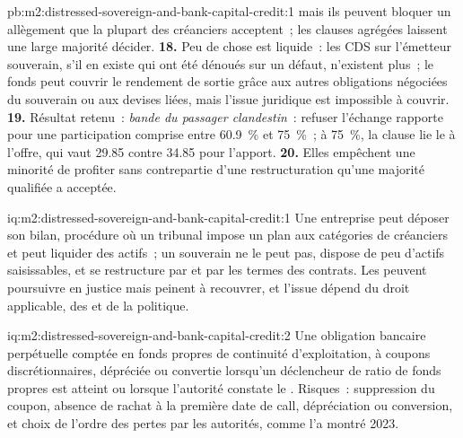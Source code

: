 \begin{solution}{pb:m2:distressed-sovereign-and-bank-capital-credit:1}
mais ils peuvent bloquer un allègement que la plupart des créanciers acceptent~; les clauses agrégées
laissent une large majorité décider.
\textbf{18.} Peu de chose est liquide~: les CDS sur l'émetteur souverain, s'il en existe qui ont été
dénoués sur un défaut, n'existent plus~; le fonds peut couvrir le rendement de sortie grâce aux autres obligations négociées du souverain ou
aux devises liées, mais l'issue juridique est impossible à couvrir.
\textbf{19.} Résultat retenu~: \emph{bande du passager clandestin}~: refuser l'échange rapporte pour une participation
comprise entre 60.9~\% et 75~\%~; à 75~\%, la clause lie le  à l'offre, qui vaut 29.85
contre 34.85 pour l'apport.
\textbf{20.} Elles empêchent une minorité de profiter sans contrepartie d'une restructuration
qu'une majorité qualifiée a acceptée.
\end{solution}

\begin{solution}{iq:m2:distressed-sovereign-and-bank-capital-credit:1}
Une entreprise peut déposer son bilan, procédure où un tribunal impose un plan aux catégories de
créanciers et peut liquider des actifs~; un souverain ne le peut pas, dispose de peu d'actifs saisissables, et
se restructure par  et par les termes des contrats. Les  peuvent
poursuivre en justice mais peinent à recouvrer, et l'issue dépend du droit applicable, des  et
de la politique.
\end{solution}

\begin{solution}{iq:m2:distressed-sovereign-and-bank-capital-credit:2}
Une obligation bancaire perpétuelle comptée en fonds propres de continuité d'exploitation, à coupons discrétionnaires,
dépréciée ou convertie lorsqu'un déclencheur de ratio de fonds propres est atteint ou lorsque l'autorité
constate le . Risques~: suppression du coupon, absence de rachat
à la première date de call, dépréciation ou conversion, et choix de l'ordre des pertes
par les autorités, comme l'a montré 2023.
\end{solution}

